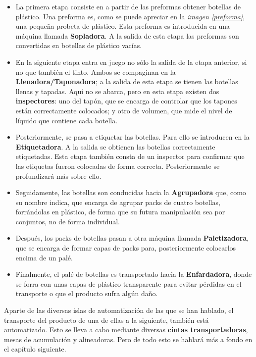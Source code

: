 \documentclass[11pt,a4paper,spanish,twoside]{report}
\begin{document}
\begin{itemize}
\item La primera etapa consiste en a partir de las preformas obtener botellas 
de plástico. Una preforma es, como se puede apreciar en la \emph{imagen  
\ref{preforma}}, una pequeña probeta de plástico. Esta preforma es
introducida en una máquina llamada \textbf{Sopladora}. A la salida de esta 
etapa las preformas son convertidas en botellas de plástico vacías.

\item En la siguiente etapa entra en juego no sólo la salida de la etapa
  anterior, si no que también el tinto. Ambos se compaginan en la
  \textbf{Llenadora/Taponadora}; a la salida de esta etapa se tienen las
  botellas llenas y tapadas. Aquí no se abarca, pero en esta etapa existen dos
\textbf{inspectores}: uno del tapón, que se encarga de controlar que los 
tapones están correctamente colocados; y otro de volumen, que mide el nivel de
líquido que contiene cada botella.

\item Posteriormente, se pasa a etiquetar las botellas. Para ello se 
introducen en la \textbf{Etiquetadora}. A la salida se obtienen las botellas
correctamente etiquetadas. Esta etapa también consta de un inspector para 
confirmar que las etiquetas fueron colocadas de forma correcta. Posteriormente
se profundizará más sobre ello.

\item Seguidamente, las botellas son conducidas hacia la \textbf{Agrupadora}
  que, como su nombre indica, que encarga de agrupar packs de cuatro 
bo\-te\-llas, forrándolas en plástico, de forma que su futura manipulación sea
por conjuntos, no de forma individual.

\item Después, los packs de botellas pasan a otra máquina llamada
  \textbf{Paletizadora}, que se encarga de formar capas de packs para,
posteriormente colocarlos encima de un palé.

\item Finalmente, el palé de botellas es transportado hacia la 
\textbf{Enfardadora}, donde se forra con unas capas de plástico transparente 
para evitar pérdidas en el transporte o que el producto sufra algún daño.

\end{itemize}
Aparte de las diversas islas de automatización de las que se han hablado, el
transporte del producto de una de ellas a la siguiente, también está 
automatizado. Esto se lleva a cabo mediante diversas \textbf{cintas 
transportadoras}, mesas de acumulación y alineadoras. Pero de todo esto se 
hablará más a fondo en el capítulo siguiente. 
\end{document}
